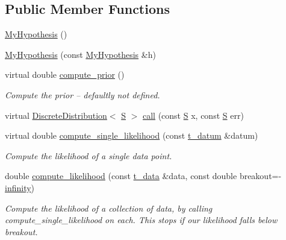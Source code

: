 \subsection*{Public Member Functions}
\begin{DoxyCompactItemize}
\item 
\hyperlink{class_my_hypothesis_ab3ad1dfa93e404fd827df6a57185f5a7}{My\+Hypothesis} ()
\item 
\hyperlink{class_my_hypothesis_a63709659c875c246a506dcff907e1cdd}{My\+Hypothesis} (const \hyperlink{class_my_hypothesis}{My\+Hypothesis} \&h)
\item 
virtual double \hyperlink{class_my_hypothesis_a67752bb4ba61994ef0cb64f7f9031f7f}{compute\+\_\+prior} ()
\begin{DoxyCompactList}\small\item\em Compute the prior -- defaultly not defined. \end{DoxyCompactList}\item 
virtual \hyperlink{class_discrete_distribution}{Discrete\+Distribution}$<$ \hyperlink{_formal_language_theory-_complex_2_main_8cpp_a51c40915539205f0b5add30b0d68a4cb}{S} $>$ \hyperlink{class_my_hypothesis_a016146970c06041b3133f60152a80a24}{call} (const \hyperlink{_formal_language_theory-_complex_2_main_8cpp_a51c40915539205f0b5add30b0d68a4cb}{S} x, const \hyperlink{_formal_language_theory-_complex_2_main_8cpp_a51c40915539205f0b5add30b0d68a4cb}{S} err)
\item 
virtual double \hyperlink{class_my_hypothesis_afcc759336d7f45f01b83807481a10f42}{compute\+\_\+single\+\_\+likelihood} (const \hyperlink{class_bayesable_a7c93a2eeab708378eb321745908718d4}{t\+\_\+datum} \&datum)
\begin{DoxyCompactList}\small\item\em Compute the likelihood of a single data point. \end{DoxyCompactList}\item 
double \hyperlink{class_my_hypothesis_a9caaf0511be161a52f7e93c2086374bc}{compute\+\_\+likelihood} (const \hyperlink{class_bayesable_a70a593a67c7d43239ecc06bb4fd06a6b}{t\+\_\+data} \&data, const double breakout=-\/\hyperlink{_numerics_8h_a1bb1e42ae1b40cad6e99da0aab8a5576}{infinity})
\begin{DoxyCompactList}\small\item\em Compute the likelihood of a collection of data, by calling compute\+\_\+single\+\_\+likelihood on each. This stops if our likelihood falls below breakout. \end{DoxyCompactList}\item 

\end{DoxyCompactItemize}
